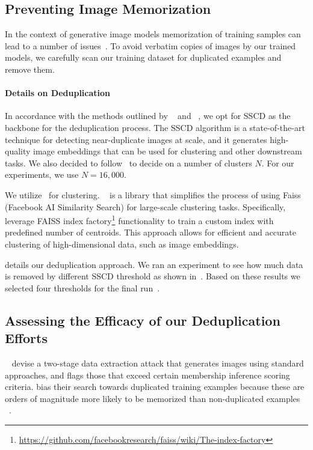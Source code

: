 %
%

%
%
%


\subsection{Preventing Image Memorization}\label{sec:dedup}
%
In the context of generative image models memorization of training samples can lead to a number of issues~\citep{somepalli2023diffusion, carlini2023extracting, somepalli2023understanding}. 
To avoid verbatim copies of images by our trained models, we carefully scan our training dataset for duplicated examples and remove them. 
%

\paragraph{Details on Deduplication}
In accordance with the methods outlined by ~\citet{carlini2023extracting} and ~\citet{somepalli2023diffusion}, we opt for SSCD \citep{pizzi2022self} as the backbone for the deduplication process. The SSCD algorithm is a state-of-the-art technique for detecting near-duplicate images at scale, and it generates high-quality image embeddings that can be used for clustering and other downstream tasks. We also decided to follow~\citet{dalle2mitigations} to decide on a number of clusters $N$. For our experiments, we use $N = 16,000$.

We utilize~\citet{autofaiss} for clustering. ~\citet{autofaiss} is a library that simplifies the process of using Faiss (Facebook AI Similarity Search) for large-scale clustering tasks. Specifically, leverage FAISS index factory\footnote{\url{https://github.com/facebookresearch/faiss/wiki/The-index-factory}} functionality to train a custom index with predefined number of centroids. This approach allows for efficient and accurate clustering of high-dimensional data, such as image embeddings.

 details our deduplication approach. We ran an experiment to see how much data is removed by different SSCD threshold as shown in~. Based on these results we selected four thresholds for the final run~.

\subsection{Assessing the Efficacy of our Deduplication Efforts}
~\citet{carlini2023extracting} devise a two-stage data extraction attack that generates images using standard approaches, and flags those that exceed certain membership inference scoring criteria. \citet{carlini2023extracting} bias their search towards duplicated training examples because these are orders of magnitude more likely to be memorized than non-duplicated examples ~\citep{somepalli2023diffusion, somepalli2023diffusion,lee2021deduplicating}. 

